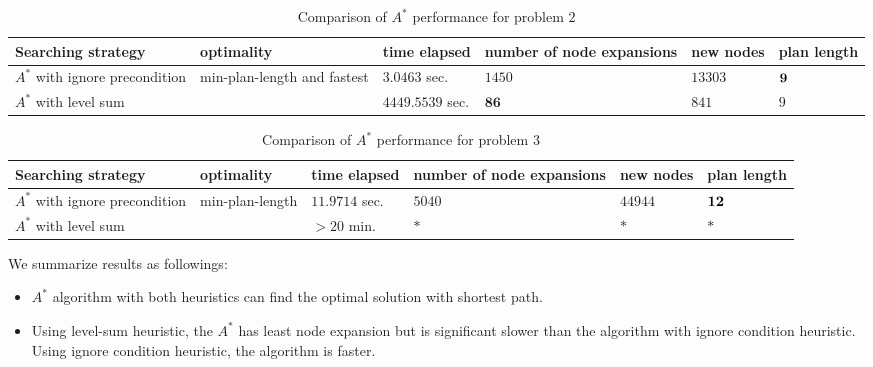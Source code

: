 \documentclass[11pt]{article}
\begin{document}
\begin{table*}[h]
 \footnotesize 
 \centering
\begin{tabular*}{0.995\textwidth}{|m{97pt}<{\centering}|m{60pt}<{\centering}|m{60pt}<{\centering}|m{60pt}<{\centering}|m{60pt}<{\centering}|m{60pt}<{\centering}|}
\hline 
Searching strategy & optimality & time elapsed  & number of node expansions &  new nodes & plan length \\ 
\hline 
\vspace{5pt} $A^*$ with ignore precondition \vspace{5pt} & min-plan-length and fastest & $3.0463$ sec.  & $1450$ & $13303$  & $\boldsymbol{9}$ \\ 
\hline 
\vspace{5pt} $A^*$ with level sum \vspace{5pt} & & $4449.5539$ sec.  & $\textbf{86}$ & $841$  & $9$ \\ 
\hline 
\end{tabular*} \vspace{-5pt}
\caption{\footnotesize Comparison of  $A^*$ performance for problem $2$} 
\label{tab: p2}
\end{table*}


\begin{table*}[h]
 \footnotesize 
 \centering
\begin{tabular*}{0.995\textwidth}{|m{97pt}<{\centering}|m{60pt}<{\centering}|m{60pt}<{\centering}|m{60pt}<{\centering}|m{60pt}<{\centering}|m{60pt}<{\centering}|}
\hline 
Searching strategy & optimality & time elapsed  & number of node expansions &  new nodes & plan length \\ 
\hline 
\vspace{5pt} $A^*$ with ignore precondition \vspace{5pt} & min-plan-length & $11.9714$ sec.  & $5040$ & $44944$  & $\boldsymbol{12}$ \\ 
\hline 
\vspace{5pt} $A^*$ with level sum \vspace{5pt} &  & $>20$ min.  & $*$ & $*$  & $*$ \\ 
\hline 
\end{tabular*} \vspace{-5pt}
\caption{\footnotesize Comparison of $A^*$ performance for problem $3$} 
\label{tab: p3}
\end{table*}

We summarize  results as followings: 
\begin{itemize}
\item $A^*$ algorithm with both heuristics can find the optimal solution with shortest path. 

\item Using level-sum heuristic, the $A^*$ has least node expansion but is significant slower than the algorithm with ignore condition heuristic. Using ignore condition heuristic, the algorithm is faster. 
\end{itemize}
\end{document}
